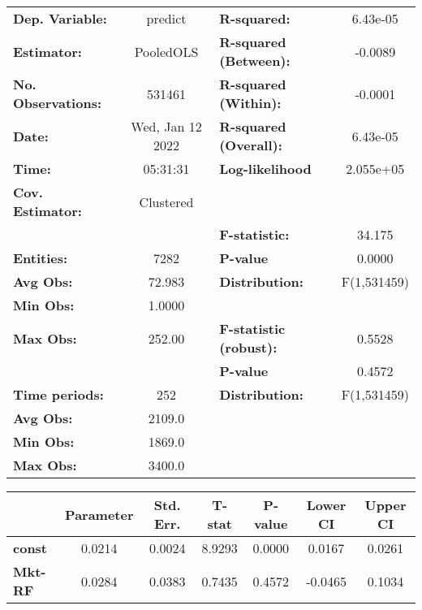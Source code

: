 \begin{center}
\begin{tabular}{lclc}
\toprule
\textbf{Dep. Variable:}    &      predict       & \textbf{  R-squared:         }   &     6.43e-05     \\
\textbf{Estimator:}        &     PooledOLS      & \textbf{  R-squared (Between):}  &     -0.0089      \\
\textbf{No. Observations:} &       531461       & \textbf{  R-squared (Within):}   &     -0.0001      \\
\textbf{Date:}             &  Wed, Jan 12 2022  & \textbf{  R-squared (Overall):}  &     6.43e-05     \\
\textbf{Time:}             &      05:31:31      & \textbf{  Log-likelihood     }   &    2.055e+05     \\
\textbf{Cov. Estimator:}   &     Clustered      & \textbf{                     }   &                  \\
\textbf{}                  &                    & \textbf{  F-statistic:       }   &      34.175      \\
\textbf{Entities:}         &        7282        & \textbf{  P-value            }   &      0.0000      \\
\textbf{Avg Obs:}          &       72.983       & \textbf{  Distribution:      }   &   F(1,531459)    \\
\textbf{Min Obs:}          &       1.0000       & \textbf{                     }   &                  \\
\textbf{Max Obs:}          &       252.00       & \textbf{  F-statistic (robust):} &      0.5528      \\
\textbf{}                  &                    & \textbf{  P-value            }   &      0.4572      \\
\textbf{Time periods:}     &        252         & \textbf{  Distribution:      }   &   F(1,531459)    \\
\textbf{Avg Obs:}          &       2109.0       & \textbf{                     }   &                  \\
\textbf{Min Obs:}          &       1869.0       & \textbf{                     }   &                  \\
\textbf{Max Obs:}          &       3400.0       & \textbf{                     }   &                  \\
\bottomrule
\end{tabular}
\begin{tabular}{lcccccc}
                & \textbf{Parameter} & \textbf{Std. Err.} & \textbf{T-stat} & \textbf{P-value} & \textbf{Lower CI} & \textbf{Upper CI}  \\
\midrule
\textbf{const}  &       0.0214       &       0.0024       &      8.9293     &      0.0000      &       0.0167      &       0.0261       \\
\textbf{Mkt-RF} &       0.0284       &       0.0383       &      0.7435     &      0.4572      &      -0.0465      &       0.1034       \\
\bottomrule
\end{tabular}
\end{center}

